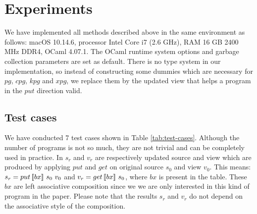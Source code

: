 \section{Experiments}

We have implemented all methods described above in the same environment as follows: macOS 10.14.6, processor Intel Core i7 (2.6 GHz), RAM 16 GB 2400 MHz DDR4, OCaml 4.07.1. The OCaml runtime system options and garbage collection parameters are set as default. There is no type system in our implementation, so instead of constructing some dummies which are necessary for $pg$, $cpg$, $kpg$ and $xpg$, we replace them by the updated view that helps a program in the $put$ direction valid.

\subsection{Test cases}

We have conducted 7 test cases shown in Table \ref{tab:test-cases}. Although the number of programs is not so much, they are not trivial and can be completely used in practice. In $s_r$ and $v_r$ are respectively updated source and view which are produced by applying $put$ and $get$ on original source $s_0$ and view $v_0$. This means: $s_r = put \, [\![bx]\!] \ s_0 \ v_0$ and $v_r = get \, [\![bx]\!] \ s_0$, where $bx$ is present in the table. These $bx$ are left associative composition since we we are only interested in this kind of program in the paper. Please note that the results $s_r$ and $v_r$ do not depend on the associative style of the composition.


